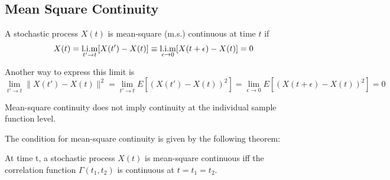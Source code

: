
\subsection{Mean Square Continuity}

\begin{definition}
A stochastic process $X(t)$ is {\elevenit mean-square (m.s.)  continuous}\/ at time $t$ if 
\[ X(t) = \mslim_{t'\to t}[X(t') - X(t)] \equiv \mslim_{\epsilon \to 0} [ X(t+\epsilon) - X(t) ] = 0 \]
\end{definition}

Another way to express this limit is 
\[ \lim_{t' \to t} \| X(t') - X(t) \|^2  = \lim_{t'\to t} E\left[(X(t') - X(t))^2 \right] = \lim_{\epsilon\to 0}E\left[(X(t+\epsilon) - X(t))^2 \right]  = 0   \]

Mean-square continuity does not imply continuity at the individual sample function level. 

The condition for mean-square continuity is given by the following theorem:
\begin{theorem}
At time t, a stochastic process $X(t)$ is mean-square continuous iff the correlation function $\Gamma(t_1, t_2)$ is continuous at $t=t_1=t_2$.
\end{theorem}

